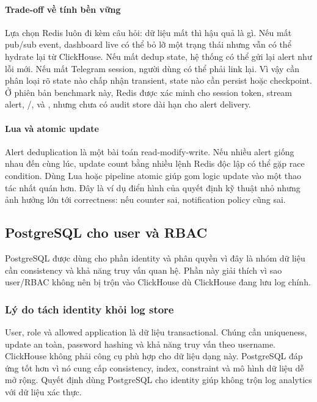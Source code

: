 \paragraph{Trade-off về tính bền vững}

Lựa chọn Redis luôn đi kèm câu hỏi: dữ liệu mất thì hậu quả là gì. Nếu mất pub/sub event, dashboard live có thể bỏ lỡ một trạng thái nhưng vẫn có thể hydrate lại từ ClickHouse. Nếu mất dedup state, hệ thống có thể gửi lại alert như lỗi mới. Nếu mất Telegram session, người dùng có thể phải link lại. Vì vậy cần phân loại rõ state nào chấp nhận transient, state nào cần persist hoặc checkpoint. Ở phiên bản benchmark này, Redis được xác minh cho session token, stream alert, /,  và , nhưng chưa có audit store dài hạn cho alert delivery.

\paragraph{Lua và atomic update}

Alert deduplication là một bài toán read-modify-write. Nếu nhiều alert giống nhau đến cùng lúc, update count bằng nhiều lệnh Redis độc lập có thể gặp race condition. Dùng Lua hoặc pipeline atomic giúp gom logic update vào một thao tác nhất quán hơn. Đây là ví dụ điển hình của quyết định kỹ thuật nhỏ nhưng ảnh hưởng lớn tới correctness: nếu counter sai, notification policy cũng sai.

\subsection{PostgreSQL cho user và RBAC}

PostgreSQL được dùng cho phần identity và phân quyền vì đây là nhóm dữ liệu cần consistency và khả năng truy vấn quan hệ. Phần này giải thích vì sao user/RBAC không nên bị trộn vào ClickHouse dù ClickHouse đang lưu log chính.

\subsubsection{Lý do tách identity khỏi log store}

User, role và allowed application là dữ liệu transactional. Chúng cần uniqueness, update an toàn, password hashing và khả năng truy vấn theo username. ClickHouse không phải công cụ phù hợp cho dữ liệu dạng này. PostgreSQL đáp ứng tốt hơn vì nó cung cấp consistency, index, constraint và mô hình dữ liệu dễ mở rộng. Quyết định dùng PostgreSQL cho identity giúp không trộn log analytics với dữ liệu xác thực.

